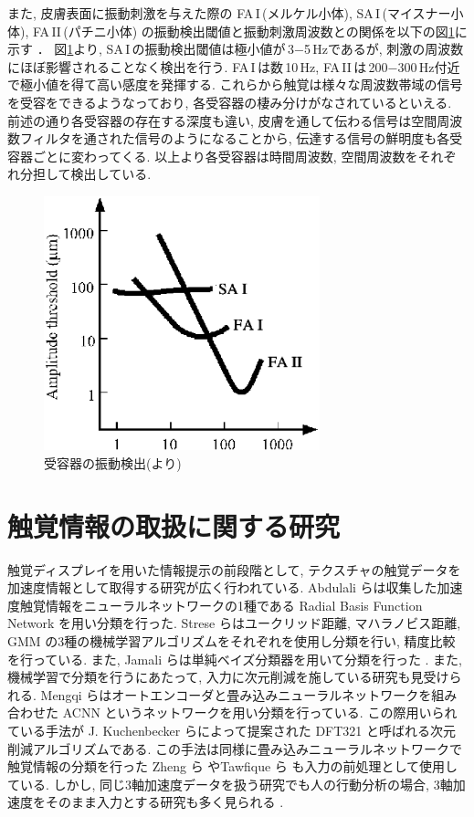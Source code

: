 また,  皮膚表面に振動刺激を与えた際の FA\rm\,I\,(メルケル小体),  SA\rm\,I\,(マイスナー小体),   FA\rm\,II\,(パチニ小体) の振動検出閾値と振動刺激周波数との関係を以下の図\ref{fig:rece}に示す \cite{前野隆司2000器用な手}．%
 図\ref{fig:rece}より,  SA\rm\,I\,の振動検出閾値は極小値が\,3$-$5\,$ \mathrm{Hz}$であるが,  刺激の周波数にほぼ影響されることなく検出を行う.  FA\rm\,I\,は数\,10\,$ \mathrm{Hz}$, FA\rm\,II\,は\,200$-$300\,$ \mathrm{Hz}$付近で極小値を得て高い感度を発揮する. これらから触覚は様々な周波数帯域の信号を受容をできるようなっており, 各受容器の棲み分けがなされているといえる. 
前述の通り各受容器の存在する深度も違い, 皮膚を通して伝わる信号は空間周波数フィルタを通された信号のようになることから, 伝達する信号の鮮明度も各受容器ごとに変わってくる. 以上より各受容器は時間周波数, 空間周波数をそれぞれ分担して検出している. 
\begin{figure}[H]
    \begin{center}
    \includegraphics[width=8cm]{eps/threshold.eps}
    \caption{受容器の振動検出(\cite{maeno}より)}
    \label{fig:rece}
   \end{center}
   \end{figure}
   
\section{触覚情報の取扱に関する研究}
触覚ディスプレイを用いた情報提示の前段階として, テクスチャの触覚データを加速度情報として取得する研究が広く行われている.  Abdulali らは収集した加速度触覚情報をニューラルネットワークの1種である Radial Basis Function Network を用い分類を行った\cite{abdulalis}.   Strese らはユークリッド距離, マハラノビス距離, GMM の3種の機械学習アルゴリズムをそれぞれを使用し分類を行い, 精度比較を行っている\cite{strese2016multimodal}. また, Jamali らは単純ベイズ分類器を用いて分類を行った \cite{jamali2010material}. 
また, 機械学習で分類を行うにあたって, 入力に次元削減を施している研究も見受けられる. 
 Mengqi らはオートエンコーダと畳み込みニューラルネットワークを組み合わせた ACNN というネットワークを用い分類を行っている\cite{mengqi}. この際用いられている手法が J. Kuchenbecker らによって提案された DFT321 \cite{dft321} と呼ばれる次元削減アルゴリズムである. この手法は同様に畳み込みニューラルネットワークで触覚情報の分類を行った Zheng ら \cite{zheng2016deep} やTawfique ら \cite{Tawfique} も入力の前処理として使用している. しかし, 同じ3軸加速度データを扱う研究でも人の行動分析の場合, 3軸加速度をそのまま入力とする研究も多く見られる \cite{active_recog}. 
 

